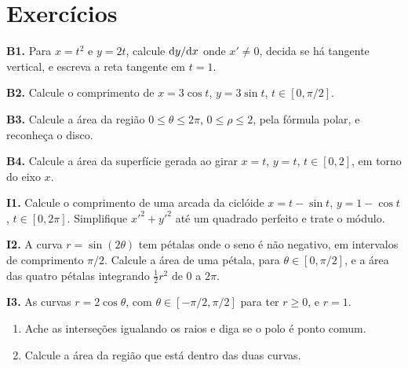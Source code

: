 \documentclass[11pt,a4paper]{article}
\begin{document}
\section{Exercícios}

\begin{exercicio}
\textbf{B1.} Para \(x=t^{2}\) e \(y=2t\), calcule \(\mathrm{d} y/\mathrm{d} x\) onde \(x'\neq 0\), decida se há tangente vertical, e escreva a reta tangente em \(t=1\).
\end{exercicio}

\begin{exercicio}
\textbf{B2.} Calcule o comprimento de \(x=3\cos t\), \(y=3\sin t\), \(t\in[0,\pi/2]\).
\end{exercicio}

\begin{exercicio}
\textbf{B3.} Calcule a área da região \(0\le\theta\le 2\pi\), \(0\le\rho\le 2\), pela fórmula polar, e reconheça o disco.
\end{exercicio}

\begin{exercicio}
\textbf{B4.} Calcule a área da superfície gerada ao girar \(x=t\), \(y=t\), \(t\in[0,2]\), em torno do eixo \(x\).
\end{exercicio}

\begin{exercicio}
\textbf{I1.} Calcule o comprimento de uma arcada da ciclóide \(x=t-\sin t\), \(y=1-\cos t\), \(t\in[0,2\pi]\). Simplifique \(x'^{2}+y'^{2}\) até um quadrado perfeito e trate o módulo.
\end{exercicio}

\begin{exercicio}
\textbf{I2.} A curva \(r=\sin(2\theta)\) tem pétalas onde o seno é não negativo, em intervalos de comprimento \(\pi/2\). Calcule a área de uma pétala, para \(\theta\in[0,\pi/2]\), e a área das quatro pétalas integrando \(\frac12 r^{2}\) de \(0\) a \(2\pi\).
\end{exercicio}

\begin{exercicio}
\textbf{I3.} As curvas \(r=2\cos\theta\), com \(\theta\in[-\pi/2,\pi/2]\) para ter \(r\ge 0\), e \(r=1\).
\begin{enumerate}
\item Ache as interseções igualando os raios e diga se o polo é ponto comum.
\item Calcule a área da região que está dentro das duas curvas.
\end{enumerate}
\end{exercicio}
\end{document}
